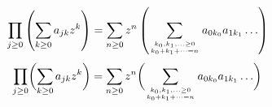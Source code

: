 $$
\prod_{j\ge 0}\left( \sum_{k\ge 0}a_{jk}z^k \right)
=
\sum_{n\ge 0} z^n \left( \sum_{k_0, k_1,\ldots\ge 0 \atop k_0+k_1+\cdots=n} a_{0k_0}a_{1k_1}\ldots
\right)
$$
$$
\prod_{j\ge 0}\biggl( \sum_{k\ge 0}a_{jk}z^k \biggr)
=
\sum_{n\ge 0} z^n \biggl( \sum_{k_0, k_1,\ldots\ge 0 \atop k_0+k_1+\cdots=n} a_{0k_0}a_{1k_1}\ldots
\biggr)
$$

\bye


